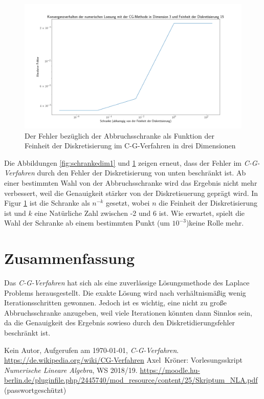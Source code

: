 \documentclass[smallheadings]{scrartcl}
\numberwithin{equation}{section}
\begin{document}
 \begin{figure}[H]
 	\centering
 	\includegraphics[width=\linewidth]{Bilder/loglogdim3}
 	\caption{Der Fehler bezüglich der Abbruchsschranke als Funktion der Feinheit der Diskretisierung im C-G-Verfahren in drei Dimensionen}
 	\label{fig:loglog3}
 \end{figure}

Die Abbildungen \ref{fig:schrankedim1} und \ref{fig:loglog3} zeigen erneut, dass der Fehler im \textit{C-G-Verfahren} durch den Fehler der Diskretisierung von unten beschränkt ist. Ab einer bestimmten Wahl von der Abbruchsschranke wird das Ergebnis nicht mehr verbessert, weil die Genauigkeit stärker von der Diskretisuerung geprägt wird. In Figur \ref{fig:loglog3} ist die Schranke als $n^{-k}$ gesetzt, wobei $n$ die Feinheit der Diskretisierung ist und $k$ eine Natürliche Zahl zwischen -2 und 6 ist. Wie erwartet, spielt die Wahl der Schranke ab einem bestimmten Punkt (um $10^{-3}$)keine Rolle mehr.

\section{Zusammenfassung}

Das \textit{C-G-Verfahren} hat sich als eine zuverlässige Lösungsmethode des Laplace Problems herausgestellt. Die exakte Lösung wird nach verhältnismäßig wenig Iterationsschritten gewonnen. Jedoch ist es wichtig, eine nicht zu große Abbruchsschranke anzugeben, weil viele Iterationen könnten dann Sinnlos sein, da die Genauigkeit des Ergebnis sowieso durch den Diskretidierungsfehler beschränkt ist.

\begin{thebibliography}{9}
 Kein Autor, Aufgerufen am \today, \textit{C-G-Verfahren}. 
\url{https://de.wikipedia.org/wiki/CG-Verfahren}
 Axel~Kröner: Vorlesungsskript \textit{Numerische Lineare Algebra}, WS 2018/19. 
\url{https://moodle.hu-berlin.de/pluginfile.php/2445740/mod_resource/content/25/Skriptum_NLA.pdf} (passwortgeschützt)
\end{thebibliography}


\end{document}
